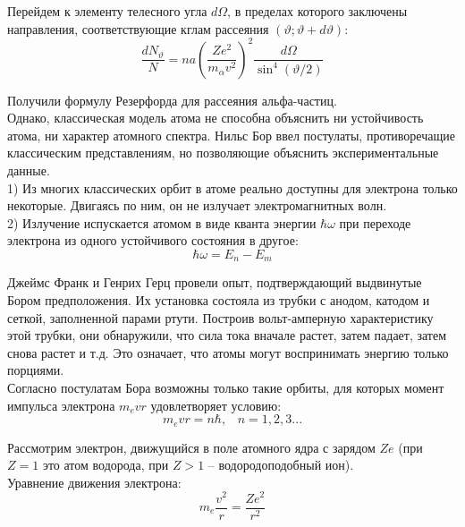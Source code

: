 \documentclass{article}
\begin{document}
	Перейдем к элементу телесного угла $d\Omega$, в пределах которого заключены направления, соответствующие кглам рассеяния $(\vartheta;\vartheta+d\vartheta)$:
	\begin{equation}
		\frac{dN_\vartheta}{N} = na(\frac{Ze^2}{m_\alpha v^2})^2\frac{d\Omega}{\sin^4(\vartheta/2)}
	\end{equation}

	Получили формулу Резерфорда для рассеяния альфа-частиц.\\

	Однако, классическая модель атома не способна объяснить ни устойчивость атома, ни характер атомного спектра. Нильс Бор ввел постулаты, противоречащие классическим представлениям, но позволяющие объяснить экспериментальные данные.\\

	1) Из многих классических орбит в атоме реально доступны для электрона только некоторые. Двигаясь по ним, он не излучает электромагнитных волн.\\

	2) Излучение испускается атомом в виде кванта энергии $\hbar\omega$ при переходе электрона из одного устойчивого состояния в другое:
	\begin{equation}
		\hbar\omega = E_n-E_m
	\end{equation}

	Джеймс Франк и Генрих Герц провели опыт, подтверждающий выдвинутые Бором предположения. Их установка состояла из трубки с анодом, катодом и сеткой, заполненной парами ртути. Построив вольт-амперную характеристику этой трубки, они обнаружили, что сила тока вначале растет, затем падает, затем снова растет и т.д. Это означает, что атомы могут воспринимать энергию только порциями.\\

	Согласно постулатам Бора возможны только такие орбиты, для которых момент импульса электрона $m_e vr$ удовлетворяет условию:
	\begin{equation}
		m_e vr = n\hbar,\;\;\;n=1,2,3...
	\end{equation}

	Рассмотрим электрон, движущийся в поле атомного ядра с зарядом $Ze$ (при $Z=1$ это атом водорода, при $Z>1$ -- водородоподобный ион).\\

	Уравнение движения электрона:
	\begin{equation}
		m_e\frac{v^2}{r}=\frac{Ze^2}{r^2}
	\end{equation}
\end{document}
